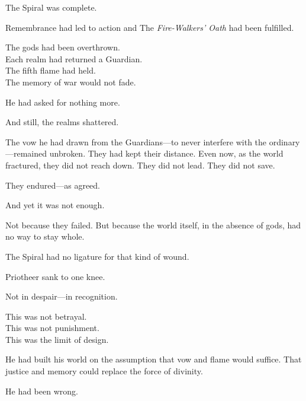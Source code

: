 \documentclass[12pt]{article}
\begin{document}
\vspace{0.5em}
The Spiral was complete.

\vspace{0.5em}
Remembrance had led to action and The \textit{Fire-Walkers’ Oath} had been fulfilled.

\vspace{0.5em}
The gods had been overthrown.\\
Each realm had returned a Guardian.\\
The fifth flame had held.\\
The memory of war would not fade.

\vspace{0.5em}
He had asked for nothing more.

\vspace{0.5em}
And still, the realms shattered.

\vspace{0.5em}
The vow he had drawn from the Guardians---to never interfere with the ordinary---remained unbroken. They had kept their distance. Even now, as the world fractured, they did not reach down. They did not lead. They did not save.

\vspace{0.5em}
They endured---as agreed.

\vspace{0.5em}
And yet it was not enough.

\vspace{0.5em}
Not because they failed. But because the world itself, in the absence of gods, had no way to stay whole.

\vspace{0.5em}
The Spiral had no ligature for that kind of wound.

\vspace{0.5em}
Priotheer sank to one knee.

\vspace{0.5em}
Not in despair---in recognition.

\vspace{0.5em}
This was not betrayal.\\
This was not punishment.\\
This was the limit of design.

\vspace{0.5em}
He had built his world on the assumption that vow and flame would suffice. That justice and memory could replace the force of divinity.

\vspace{0.5em}
He had been wrong.
\end{document}
